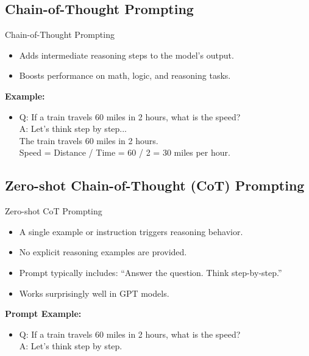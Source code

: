 \subsection{Chain-of-Thought Prompting}
\begin{frame}{Chain-of-Thought Prompting}
    \begin{itemize}
        \setlength{\itemsep}{1em}
        \item Adds intermediate reasoning steps to the model's output.
        \item Boosts performance on math, logic, and reasoning tasks.
    \end{itemize}
    \vspace{1em}
    \textbf{Example:}
    \begin{itemize}
        \item Q: If a train travels 60 miles in 2 hours, what is the speed?\\[1em]
        A: Let's think step by step...\\[0.5em]
        The train travels 60 miles in 2 hours.\\[0.5em]
        Speed = Distance / Time = 60 / 2 = 30 miles per hour.
    \end{itemize}
\end{frame}


\subsection{Zero-shot Chain-of-Thought (CoT) Prompting}
\begin{frame}{Zero-shot CoT Prompting}
    \begin{itemize}
        \setlength{\itemsep}{1em}
        \item A single example or instruction triggers reasoning behavior.
        \item No explicit reasoning examples are provided.
        \item Prompt typically includes: ``Answer the question. Think step-by-step.''
        \item Works surprisingly well in GPT models.
    \end{itemize}
    \vspace{1em}
    \textbf{Prompt Example:}
    \begin{itemize}
        \item Q: If a train travels 60 miles in 2 hours, what is the speed?\\
        A: Let's think step by step.
    \end{itemize}
\end{frame}


